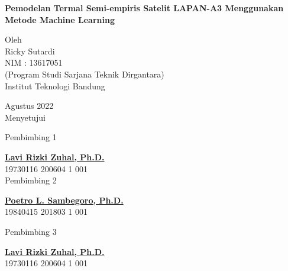 \newpage

\begin{center}
       \Large
        \vspace{1.5cm}
        \large
        \textbf{Pemodelan Termal Semi-empiris Satelit LAPAN-A3 Menggunakan Metode Machine Learning}\\
        
        \vfill
        
        Oleh\\
        Ricky Sutardi\\
        NIM : 13617051\\
        (Program Studi Sarjana Teknik Dirgantara)\\
        Institut Teknologi Bandung
       
       \vfill
       
       Agustus 2022\\
        \vspace{1.0cm}
       Menyetujui\\
       \begin{multicols}{2}
       
       Pembimbing 1 \\
       \vspace{3.5cm}
       
       \textbf{\underline{Lavi Rizki Zuhal, Ph.D.}}\\
        19730116 200604 1 001 \\
        
        Pembimbing 2 \\
       \vspace{3.5cm}
       
       \textbf{\underline{Poetro L. Sambegoro, Ph.D.}}\\
        19840415 201803 1 001 \\
        \end{multicols}

       Pembimbing 3 \\
       \vspace{3.5cm}
       
       \textbf{\underline{Lavi Rizki Zuhal, Ph.D.}}\\
        19730116 200604 1 001 \\
       
\end{center}
